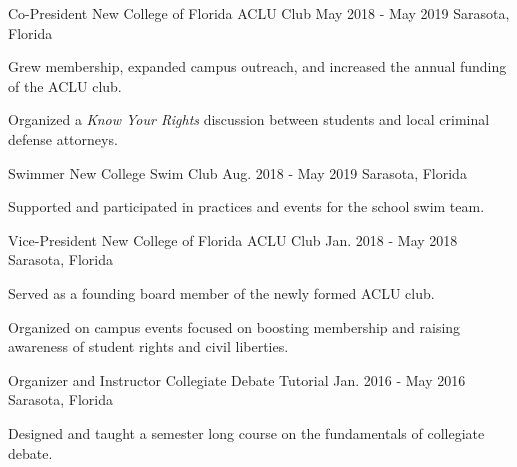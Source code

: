 

\begin{cventries}


\cventry
  {Co-President} %
  {New College of Florida ACLU Club} %
  {May 2018 - May 2019} %
  {Sarasota, Florida} %
  {
    \begin{cvitems} %
      \item {Grew membership, expanded campus outreach, and increased the annual funding of the ACLU club.}
      \item {Organized a \emph{Know Your Rights} discussion between students and local criminal defense attorneys.}
    \end{cvitems}
  }

  \cventry
    {Swimmer} %
    {New College Swim Club} %
    {Aug. 2018 - May 2019} %
    {Sarasota, Florida} %
    {
      \begin{cvitems} %
        \item {Supported and participated in practices and events for the school swim team.}
      \end{cvitems}
    }

  \cventry
    {Vice-President} %
    {New College of Florida ACLU Club} %
    {Jan. 2018 - May 2018} %
    {Sarasota, Florida} %
    {
      \begin{cvitems} %
        \item {Served as a founding board member of the newly formed ACLU club.}
        \item {Organized on campus events focused on boosting membership and raising awareness of student rights and civil liberties.}
      \end{cvitems}
    }

  \cventry
    {Organizer and Instructor} %
    {Collegiate Debate Tutorial} %
    {Jan. 2016 - May 2016} %
    {Sarasota, Florida} %
    {
      \begin{cvitems} %
        \item {Designed and taught a semester long course on the fundamentals of collegiate debate.}
      \end{cvitems}
    }



\end{cventries}
